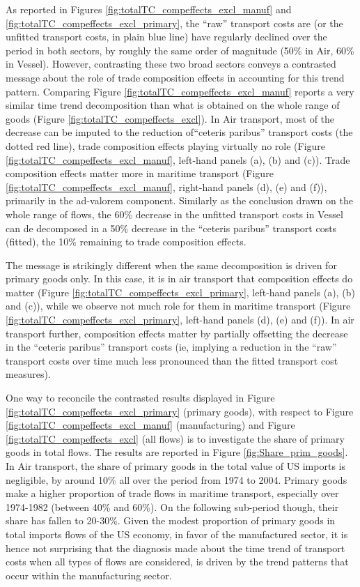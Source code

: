 \documentclass[11pt,twoside, authoryear]{elsarticle}
\begin{document}
As reported in Figures \ref{fig:totalTC_compeffects_excl_manuf} and \ref{fig:totalTC_compeffects_excl_primary}, the ``raw'' transport costs are (or the unfitted transport costs, in plain blue line) have regularly declined over the period in both sectors, by roughly the same order of magnitude (50\% in Air, 60\% in Vessel). However, contrasting these two broad sectors conveys a contrasted message about the role of trade composition effects in accounting for this trend pattern. Comparing Figure \ref{fig:totalTC_compeffects_excl_manuf} reports a very similar time trend decomposition than what is obtained on the whole range of goods (Figure \ref{fig:totalTC_compeffects_excl}). In Air transport, most of the decrease can be imputed to the reduction of``ceteris paribus'' transport costs (the dotted red line), trade composition effects playing virtually no role (Figure \ref{fig:totalTC_compeffects_excl_manuf}, left-hand panels (a), (b) and (c)). Trade composition effects matter more in maritime transport (Figure \ref{fig:totalTC_compeffects_excl_manuf}, right-hand panels (d), (e) and (f)), primarily in the ad-valorem component. Similarly as the conclusion drawn on the whole range of flows, the 60\% decrease in the unfitted transport costs in Vessel can de decomposed in a 50\% decrease in the ``ceteris paribus'' transport costs (fitted), the 10\% remaining to trade composition effects.

The message is strikingly different when the same decomposition is driven for primary goods only. In this case, it is in air transport that composition effects do matter (Figure \ref{fig:totalTC_compeffects_excl_primary}, left-hand panels (a), (b) and (c)), while we observe not much role for them in maritime transport (Figure \ref{fig:totalTC_compeffects_excl_primary}, left-hand panels (d), (e) and (f)). In air transport further, composition effects matter by partially offsetting the decrease in the ``ceteris paribus'' transport costs (ie, implying a reduction in the ``raw'' transport costs over time much less pronounced than the fitted transport cost measures).

One way to reconcile the contrasted results displayed in Figure \ref{fig:totalTC_compeffects_excl_primary} (primary goods), with respect to Figure \ref{fig:totalTC_compeffects_excl_manuf} (manufacturing) and Figure \ref{fig:totalTC_compeffects_excl} (all flows) is to investigate the share of primary goods in total flows. The results are reported in Figure \ref{fig:Share_prim_goods}. In Air transport, the share of primary goods in the total value of US imports is negligible, by around 10\% all over the period from 1974 to 2004. Primary goods make a higher proportion of trade flows in maritime transport, especially over 1974-1982 (between 40\% and 60\%). On the following sub-period though, their share has fallen to 20-30\%. Given the modest proportion of primary goods in total imports flows of the US economy, in favor of the manufactured sector, it is hence not surprising that the diagnosis made about the time trend of transport costs when all types of flows are considered, is driven by the trend patterns that occur within the manufacturing sector.
\end{document}
